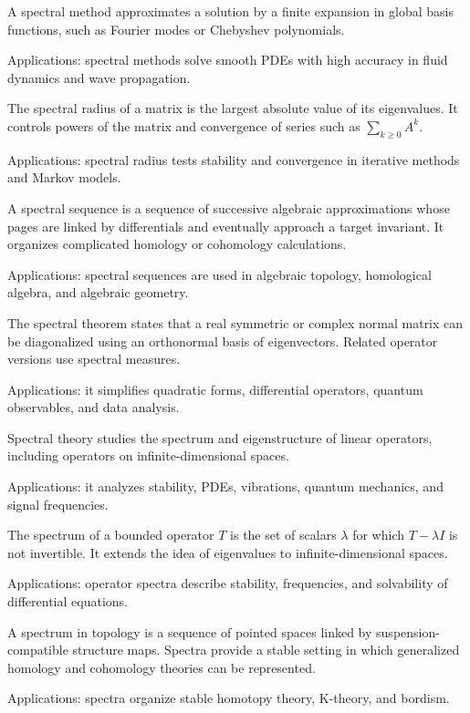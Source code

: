 A spectral method approximates a solution by a finite expansion in global basis functions, such as Fourier modes or Chebyshev polynomials. \par\noindent Applications: spectral methods solve smooth PDEs with high accuracy in fluid dynamics and wave propagation.

The spectral radius of a matrix is the largest absolute value of its eigenvalues. It controls powers of the matrix and convergence of series such as $\sum_{k\geq0}A^k$. \par\noindent Applications: spectral radius tests stability and convergence in iterative methods and Markov models.

A spectral sequence is a sequence of successive algebraic approximations whose pages are linked by differentials and eventually approach a target invariant. It organizes complicated homology or cohomology calculations. \par\noindent Applications: spectral sequences are used in algebraic topology, homological algebra, and algebraic geometry.

The spectral theorem states that a real symmetric or complex normal matrix can be diagonalized using an orthonormal basis of eigenvectors. Related operator versions use spectral measures. \par\noindent Applications: it simplifies quadratic forms, differential operators, quantum observables, and data analysis.

Spectral theory studies the spectrum and eigenstructure of linear operators, including operators on infinite-dimensional spaces. \par\noindent Applications: it analyzes stability, PDEs, vibrations, quantum mechanics, and signal frequencies.

The spectrum of a bounded operator $T$ is the set of scalars $\lambda$ for which $T-\lambda I$ is not invertible. It extends the idea of eigenvalues to infinite-dimensional spaces. \par\noindent Applications: operator spectra describe stability, frequencies, and solvability of differential equations.

A spectrum in topology is a sequence of pointed spaces linked by suspension-compatible structure maps. Spectra provide a stable setting in which generalized homology and cohomology theories can be represented. \par\noindent Applications: spectra organize stable homotopy theory, K-theory, and bordism.

